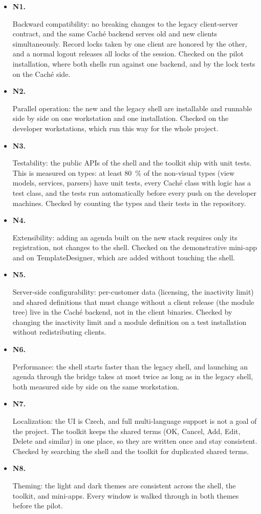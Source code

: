 \documentclass{article}
\newcommand{\reqdef}[1]{\hypertarget{req:#1}{\textbf{#1.}}}
\begin{document}
\begin{itemize}
  \item \reqdef{N1} Backward compatibility: no breaking changes to the legacy client-server contract, and the same Caché backend serves old and new clients simultaneously. Record locks taken by one client are honored by the other, and a normal logout releases all locks of the session. Checked on the pilot installation, where both shells run against one backend, and by the lock tests on the Caché side.
  \item \reqdef{N2} Parallel operation: the new and the legacy shell are installable and runnable side by side on one workstation and one installation. Checked on the developer workstations, which run this way for the whole project.
  \item \reqdef{N3} Testability: the public APIs of the shell and the toolkit ship with unit tests. This is measured on types: at least 80~\% of the non-visual types (view models, services, parsers) have unit tests, every Caché class with logic has a test class, and the tests run automatically before every push on the developer machines. Checked by counting the types and their tests in the repository.
  \item \reqdef{N4} Extensibility: adding an agenda built on the new stack requires only its registration, not changes to the shell. Checked on the demonstrative mini-app and on TemplateDesigner, which are added without touching the shell.
  \item \reqdef{N5} Server-side configurability: per-customer data (licensing, the inactivity limit) and shared definitions that must change without a client release (the module tree) live in the Caché backend, not in the client binaries. Checked by changing the inactivity limit and a module definition on a test installation without redistributing clients.
  \item \reqdef{N6} Performance: the shell starts faster than the legacy shell, and launching an agenda through the bridge takes at most twice as long as in the legacy shell, both measured side by side on the same workstation.
  \item \reqdef{N7} Localization: the UI is Czech, and full multi-language support is not a goal of the project. The toolkit keeps the shared terms (OK, Cancel, Add, Edit, Delete and similar) in one place, so they are written once and stay consistent. Checked by searching the shell and the toolkit for duplicated shared terms.
  \item \reqdef{N8} Theming: the light and dark themes are consistent across the shell, the toolkit, and mini-apps. Every window is walked through in both themes before the pilot.

\end{itemize}
\end{document}
